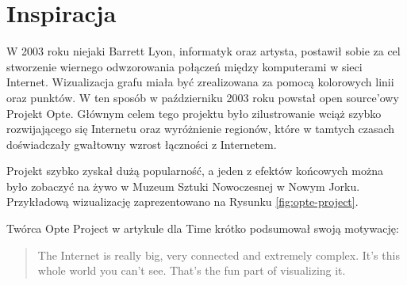 \section{Inspiracja}
W 2003 roku niejaki Barrett Lyon, informatyk oraz artysta, postawił sobie za cel stworzenie wiernego odwzorowania połączeń między komputerami w sieci Internet. Wizualizacja grafu miała być zrealizowana za pomocą kolorowych linii oraz punktów. W ten sposób w październiku 2003 roku powstał open source'owy Projekt Opte. Głównym celem tego projektu było zilustrowanie wciąż szybko rozwijającego się Internetu oraz wyróżnienie regionów, które w tamtych czasach doświadczały gwałtowny wzrost łączności z Internetem.

Projekt szybko zyskał dużą popularność, a jeden z efektów końcowych można było zobaczyć na żywo w Muzeum Sztuki Nowoczesnej w Nowym Jorku. Przykładową wizualizację zaprezentowano na Rysunku \ref{fig:opte-project}.

Twórca Opte Project w artykule dla Time \cite{OpteProject:Time} krótko podsumował swoją motywację:

\begin{center}
	\hyphenblockcquote{USenglish}{OpteProject:Time}{
		The Internet is really big, very connected and extremely complex. \linebreak
		It’s this whole world you can’t see. That’s the fun part of visualizing it.
	}
\end{center}

